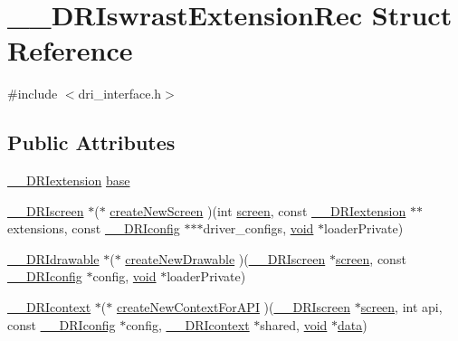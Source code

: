 \hypertarget{struct_____d_r_iswrast_extension_rec}{}\section{\+\_\+\+\_\+\+D\+R\+Iswrast\+Extension\+Rec Struct Reference}
\label{struct_____d_r_iswrast_extension_rec}


{\ttfamily \#include $<$dri\+\_\+interface.\+h$>$}

\subsection*{Public Attributes}
\begin{DoxyCompactItemize}
\item 
\hyperlink{dri__interface_8h_a4e0a61c8ece00d2b2c6792a9a1b55385}{\+\_\+\+\_\+\+D\+R\+Iextension} \hyperlink{struct_____d_r_iswrast_extension_rec_abf612ae76eaa8762ec951509c3e38cad}{base}
\item 
\hyperlink{dri__interface_8h_a9961b01d421ee1fd6ed3c05acc9ca561}{\+\_\+\+\_\+\+D\+R\+Iscreen} $\ast$($\ast$ \hyperlink{struct_____d_r_iswrast_extension_rec_a2e6fb0aa44e0a62e42dba3b38a859651}{create\+New\+Screen} )(int \hyperlink{cad_8h_ae04e09e4e3831bfc1632c509ae37dcec}{screen}, const \hyperlink{dri__interface_8h_a4e0a61c8ece00d2b2c6792a9a1b55385}{\+\_\+\+\_\+\+D\+R\+Iextension} $\ast$$\ast$extensions, const \hyperlink{dri__interface_8h_aeac81999efbbf8b1d6886338e3ea24d9}{\+\_\+\+\_\+\+D\+R\+Iconfig} $\ast$$\ast$$\ast$driver\+\_\+configs, \hyperlink{_s_d_l__opengles2__gl2ext_8h_ae5d8fa23ad07c48bb609509eae494c95}{void} $\ast$loader\+Private)
\item 
\hyperlink{dri__interface_8h_a5bfb832a0a08208d95b3bbef439d2262}{\+\_\+\+\_\+\+D\+R\+Idrawable} $\ast$($\ast$ \hyperlink{struct_____d_r_iswrast_extension_rec_a1be0352446fb3c31a8f7a86adae7e4f1}{create\+New\+Drawable} )(\hyperlink{dri__interface_8h_a9961b01d421ee1fd6ed3c05acc9ca561}{\+\_\+\+\_\+\+D\+R\+Iscreen} $\ast$\hyperlink{cad_8h_ae04e09e4e3831bfc1632c509ae37dcec}{screen}, const \hyperlink{dri__interface_8h_aeac81999efbbf8b1d6886338e3ea24d9}{\+\_\+\+\_\+\+D\+R\+Iconfig} $\ast$config, \hyperlink{_s_d_l__opengles2__gl2ext_8h_ae5d8fa23ad07c48bb609509eae494c95}{void} $\ast$loader\+Private)
\item 
\hyperlink{dri__interface_8h_a3fd295cba82b5a3d79f1ee7e12bfb908}{\+\_\+\+\_\+\+D\+R\+Icontext} $\ast$($\ast$ \hyperlink{struct_____d_r_iswrast_extension_rec_aecf9ead53dd56266c68a332b8f396fdf}{create\+New\+Context\+For\+A\+PI} )(\hyperlink{dri__interface_8h_a9961b01d421ee1fd6ed3c05acc9ca561}{\+\_\+\+\_\+\+D\+R\+Iscreen} $\ast$\hyperlink{cad_8h_ae04e09e4e3831bfc1632c509ae37dcec}{screen}, int api, const \hyperlink{dri__interface_8h_aeac81999efbbf8b1d6886338e3ea24d9}{\+\_\+\+\_\+\+D\+R\+Iconfig} $\ast$config, \hyperlink{dri__interface_8h_a3fd295cba82b5a3d79f1ee7e12bfb908}{\+\_\+\+\_\+\+D\+R\+Icontext} $\ast$shared, \hyperlink{_s_d_l__opengles2__gl2ext_8h_ae5d8fa23ad07c48bb609509eae494c95}{void} $\ast$\hyperlink{gl_8h_a2e335d56e2846b0fea47eed068b2d34a}{data})
$$
\end{DoxyCompactItemize}
